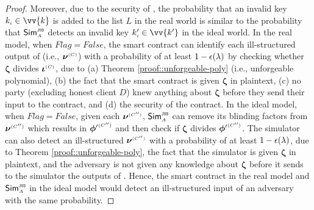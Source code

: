 \begin{proof}
Moreover, due to the security of \zspaa, the probability that an invalid key $k_{\st i}\in \vv{k}$ is added to the list $  L$ in the real world is similar to the probability that  $\mathsf{Sim}^{\scriptscriptstyle \mathtt{JUS}}_{\scriptscriptstyle A}$ detects an invalid key $  k'_{\st i}\in \vv{k'}$ in the ideal world. In the real model, when $Flag=False$, the smart contract can identify each ill-structured output of \vopr (i.e.,  $\bm\nu^{ \scriptscriptstyle {  {(C)}} }$) with a probability of at least $1-\epsilon(\lambda)$ by checking whether $\bm\zeta$  divides $\bm\iota^{ \scriptscriptstyle {  {(C)}}}$, due to  (a) Theorem \ref{proof::unforgeable-poly} (i.e., unforgeable polynomial), (b) the fact that the smart contract is given $\bm \zeta$ in plaintext, (c) no party (excluding honest client $D$) knew anything about $\bm \zeta$ before they send their input to the contract, and (d) the security of the contract. In the ideal model, when $Flag=False$, given each $ {\bm\nu}^{ \scriptscriptstyle {  {(C'')}} }$, $\mathsf{Sim}^{\scriptscriptstyle \mathtt{JUS}}_{\scriptscriptstyle A}$ can remove its blinding factors from  $ {\bm\nu}^{ \scriptscriptstyle {  {(C'')}} }$ which results in $ {\bm\phi'}^{ \scriptscriptstyle {  {(C'')}} }$ and then check if $ {\bm\zeta}$  divides $ {\bm\phi'}^{ \scriptscriptstyle {  {(C'')}} }$. The simulator can also detect an ill-structured  $ {\bm\nu}^{ \scriptscriptstyle {  {(C'')}} }$ with a probability of at least $1-\epsilon(\lambda)$, due to Theorem \ref{proof::unforgeable-poly}, the fact that the simulator is given $ {\bm \zeta}$ in plaintext,  and the adversary is not given any knowledge about $ {\bm \zeta}$ before it sends to the simulator the outputs of \vopr.  Hence, the smart contract in the real model and $\mathsf{Sim}^{\scriptscriptstyle \mathtt{JUS}}_{\scriptscriptstyle A}$ in the ideal model would detect an ill-structured input of an adversary with the same probability. 




\end{proof}
